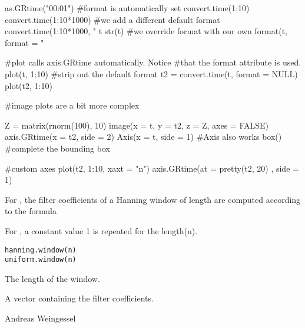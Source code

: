 \documentclass[a4paper]{book}
\begin{document}
%
\begin{Examples}
\begin{ExampleCode}
as.GRtime("00:01")
#format is automatically set
convert.time(1:10)
convert.time(1:10*1000)
#we add a different default format
convert.time(1:10*1000, "%
t
str(t)
#we override format with our own
format(t, format = "%

#plot calls axis.GRtime automatically. Notice
#that the format attribute is used.
plot(t, 1:10)
#strip out the default format
t2 = convert.time(t, format = NULL)
plot(t2, 1:10)

#image plots are a bit more complex

Z = matrix(rnorm(100), 10)
image(x = t, y = t2, z = Z, axes = FALSE)
axis.GRtime(x = t2, side = 2)
Axis(x = t, side = 1) #Axis also works
box() #complete the bounding box

#custom axes
plot(t2, 1:10, xaxt = "n")
axis.GRtime(at = pretty(t2, 20) , side = 1)
\end{ExampleCode}
\end{Examples}
%
\begin{Description}\relax
For , the filter coefficients  of a Hanning window of length 
 are computed according to the formula

For , a constant value 1 is repeated for the length(n).
\end{Description}
%
\begin{Usage}
\begin{verbatim}
hanning.window(n)
uniform.window(n)
\end{verbatim}
\end{Usage}
%
\begin{Arguments}
\begin{ldescription}
\item[\code{n}] The length of the window.
\end{ldescription}
\end{Arguments}
%
\begin{Value}
A vector containing the filter coefficients.
\end{Value}
%
\begin{Author}\relax
Andreas Weingessel
\end{Author}
\end{document}
